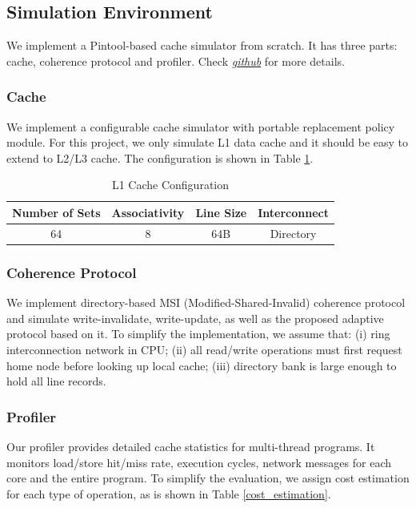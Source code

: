 \documentclass[11pt,conference]{IEEEtran}
\begin{document}
\subsection{Simulation Environment}
We implement a Pintool-based cache simulator from scratch. It has three parts: cache, coherence protocol and profiler. Check \href{https://github.com/lihao98722/15740-Computer-Architecture-Final-Project}{\textit{github}} for more details.

\subsubsection{Cache}
We implement a configurable cache simulator with portable replacement policy module. For this project, we only simulate L1 data cache and it should be easy to extend to L2/L3 cache. The configuration is shown in Table \ref{l1_cache_config}.

\begin{table}[!h]
\renewcommand{\arraystretch}{2.5}
\caption{L1 Cache Configuration}
\label{l1_cache_config}
\centering
\begin{tabular}{|c|c|c|c|}
\hline
Number of Sets & Associativity & Line Size & Interconnect \\
\hline
64 & 8 & 64B & Directory \\
\hline
\end{tabular}
\end{table}
\FloatBarrier

\subsubsection{Coherence Protocol}
We implement directory-based MSI (Modified-Shared-Invalid) coherence protocol and simulate write-invalidate, write-update, as well as the proposed adaptive protocol based on it. To simplify the implementation, we assume that: (i) ring interconnection network in CPU; (ii) all read/write operations must first request home node before looking up local cache; (iii) directory bank is large enough to hold all line records.

\subsubsection{Profiler}
Our profiler provides detailed cache statistics for multi-thread programs. It monitors load/store hit/miss rate, execution cycles, network messages for each core and the entire program. To simplify the evaluation, we assign cost estimation for each type of operation, as is shown in Table \ref{cost_estimation}.
\end{document}
